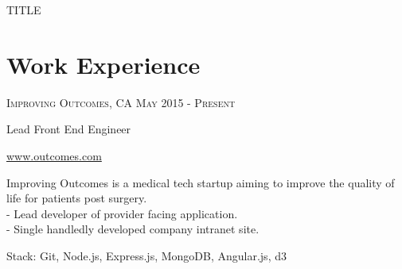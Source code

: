 \documentclass[10pt]{article}
\begin{document}
    \color{body}

        \begin{minipage}[t]{\textwidth}
            TITLE
        \end{minipage}

        \begin{minipage}[t]{0.6\textwidth}
            \vspace{0pt}

            \section{Work Experience}

            {
                {\small \textsc{
                    Improving Outcomes, CA
                    \hfill
                    {\raggedleft
                        May 2015 - Present
                    }}
                }

                {\raggedright\large {
                    Lead Front End Engineer
                } \\}

                {\small {
                    \href{http://www.outcomes.com}{www.outcomes.com}
                } \vspace{5pt}}

                \normalsize{
                    Improving Outcomes is a medical tech startup aiming to improve the quality of life for patients post surgery. \\
                    - Lead developer of provider facing application. \\
                    - Single handledly developed company intranet site.

                    { \vspace{5pt}
                        \small Stack: {
                            \color{highlight}
                            Git,
                            Node.js,
                            Express.js,
                            MongoDB,
                            Angular.js,
                            d3
                        }
                    }
                }\\
            }
        \end{minipage}
\end{document}
